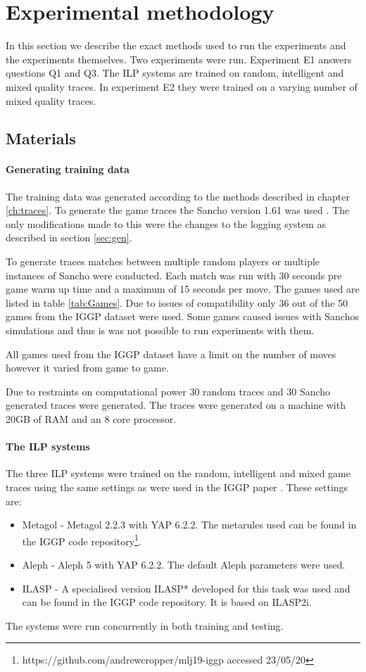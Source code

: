 \chapter{Experimental methodology}\label{ch:methodology}

In this section we describe the exact methods used to run the experiments and the experiments themselves. Two experiments were run. Experiment E1 answers questions Q1 and Q3. The ILP systems are trained on random, intelligent and mixed quality traces. In experiment E2 they were trained on a varying number of mixed quality traces. 

\section{Materials}
\subsubsection{Generating training data}
The training data was generated according to the methods described in chapter \ref{ch:traces}. To generate the game traces the Sancho version 1.61 was used \cite{Sancho/Github}. The only modifications made to this were the changes to the logging system as described in section \ref{sec:gen}.

To generate traces matches between multiple random players or multiple instances of Sancho were conducted. Each match was run with 30 seconds pre game warm up time and a maximum of 15 seconds per move. The games used are listed in table \ref{tab:Games}. Due to issues of compatibility only 36 out of the 50 games from the IGGP dataset were used. Some games caused issues with Sanchos simulations and thus is was not possible to run experiments with them. 

All games used from the IGGP dataset have a limit on the number of moves however it varied from game to game.

Due to restraints on computational power 30 random traces and 30 Sancho generated traces were generated. The traces were generated on a machine with 20GB of RAM and an 8 core processor. 

\subsubsection{The ILP systems}

The three ILP systems were trained on the random, intelligent and mixed game traces using the same settings as were used in the IGGP paper \cite{Cropper/IGGP}. These settings are:
\begin{itemize}
	\item Metagol - Metagol 2.2.3 with YAP 6.2.2. The metarules used can be found in the IGGP code repository\footnote{https://github.com/andrewcropper/mlj19-iggp accessed 23/05/20}.
	\item Aleph - Aleph 5 with YAP 6.2.2. The default Aleph parameters were used.
	\item ILASP - A specialised version ILASP* developed for this task was used and can be found in the IGGP code repository. It is based on ILASP2i.
\end{itemize}
The systems were run concurrently in both training and testing.


